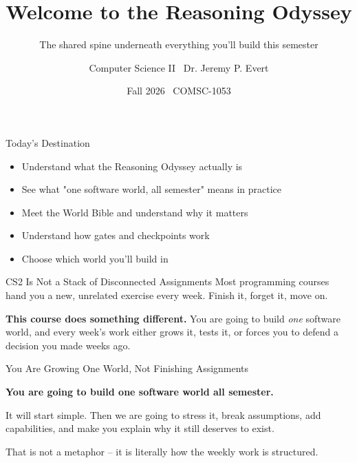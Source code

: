 \documentclass[aspectratio=169]{beamer}
\title{Welcome to the Reasoning Odyssey}
\subtitle{The shared spine underneath everything you'll build this semester}
\author{Computer Science II \textbullet\ Dr. Jeremy P. Evert}
\date{Fall 2026 \textbullet\ COMSC-1053}
\begin{document}
\begin{frame}[plain]
  \titlepage
\end{frame}

\begin{destinationframe}{Today's Destination}
  \begin{itemize}
    \item Understand what the Reasoning Odyssey actually is
    \item See what "one software world, all semester" means in practice
    \item Meet the World Bible and understand why it matters
    \item Understand how gates and checkpoints work
    \item Choose which world you'll build in
  \end{itemize}
\end{destinationframe}

\begin{whymattersframe}{CS2 Is Not a Stack of Disconnected Assignments}
  Most programming courses hand you a new, unrelated exercise every week.
  Finish it, forget it, move on.

  \vspace{3mm}
  \textbf{This course does something different.} You are going to build
  \emph{one} software world, and every week's work either grows it,
  tests it, or forces you to defend a decision you made weeks ago.
\end{whymattersframe}

\begin{conceptframe}{You Are Growing One World, Not Finishing Assignments}
  \begin{center}
    \large\color{cs2primary}
    \textbf{You are going to build one software world all semester.}
  \end{center}
  \vspace{2mm}
  It will start simple. Then we are going to stress it, break
  assumptions, add capabilities, and make you explain why it still
  deserves to exist.

  \vspace{3mm}
  \small That is not a metaphor -- it is literally how the weekly work
  is structured.
\end{conceptframe}
\end{document}
